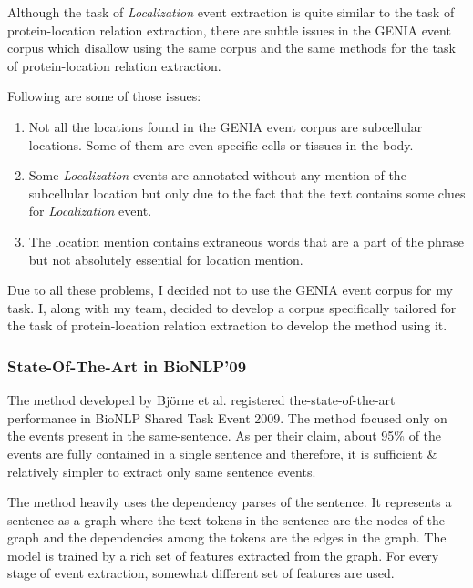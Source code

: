 Although the task of \textit{Localization} event extraction is quite similar to the task of protein-location relation extraction, there are subtle issues in the GENIA event corpus which disallow using the same corpus and the same methods for the task of protein-location relation extraction.

Following are some of those issues:

\begin{enumerate}

\item Not all the locations found in the GENIA event corpus are subcellular locations. Some of them are even specific cells or tissues in the body.

\item Some \textit{Localization} events are annotated without any mention of the subcellular location but only due to the fact that the text contains some clues for \textit{Localization} event.

\item The location mention contains extraneous words that are a part of the phrase but not absolutely essential for location mention.

\end{enumerate}

Due to all these problems, I decided not to use the GENIA event corpus for my task. I, along with my team, decided to develop a corpus specifically tailored for the task of protein-location relation extraction to develop the method using it.

\subsubsection{State-Of-The-Art in BioNLP'09} \label{sec:JariBioNLP}

The method developed by Björne et al. \cite{bjorne2009extracting} registered the-state-of-the-art performance in BioNLP Shared Task Event 2009. The method focused only on the events present in the same-sentence. As per their claim, about 95\% of the events are fully contained in a single sentence and therefore, it is sufficient \& relatively simpler to extract only same sentence events.

The method heavily uses the dependency parses of the sentence. It represents a sentence as a graph where the text tokens in the sentence are the nodes of the graph and the dependencies among the tokens are the edges in the graph. The model is trained by a rich set of features extracted from the graph. For every stage of event extraction, somewhat different set of features are used. 


